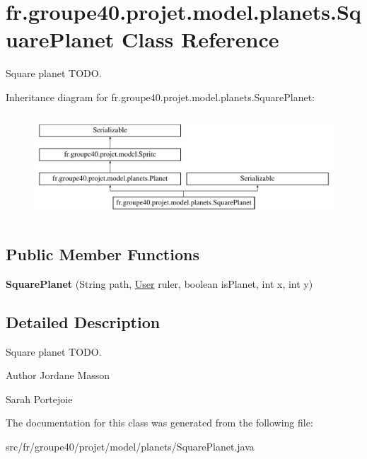\hypertarget{classfr_1_1groupe40_1_1projet_1_1model_1_1planets_1_1_square_planet}{}\section{fr.\+groupe40.\+projet.\+model.\+planets.\+Square\+Planet Class Reference}
\label{classfr_1_1groupe40_1_1projet_1_1model_1_1planets_1_1_square_planet}


Square planet T\+O\+DO.  


Inheritance diagram for fr.\+groupe40.\+projet.\+model.\+planets.\+Square\+Planet\+:\begin{figure}[H]
\begin{center}
\leavevmode
\includegraphics[height=3.957597cm]{classfr_1_1groupe40_1_1projet_1_1model_1_1planets_1_1_square_planet}
\end{center}
\end{figure}
\subsection*{Public Member Functions}
\begin{DoxyCompactItemize}
\item 
\mbox{\label{classfr_1_1groupe40_1_1projet_1_1model_1_1planets_1_1_square_planet_af5c59fb2f1bbd57745396640f074f3af}} 
{\bfseries Square\+Planet} (String path, \hyperlink{classfr_1_1groupe40_1_1projet_1_1client_1_1_user}{User} ruler, boolean is\+Planet, int x, int y)
\end{DoxyCompactItemize}


\subsection{Detailed Description}
Square planet T\+O\+DO. 

\begin{DoxyAuthor}{Author}
Jordane Masson 

Sarah Portejoie 
\end{DoxyAuthor}


The documentation for this class was generated from the following file\+:\begin{DoxyCompactItemize}
\item 
src/fr/groupe40/projet/model/planets/Square\+Planet.\+java\end{DoxyCompactItemize}
